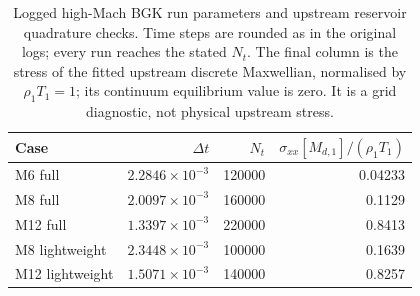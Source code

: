 \documentclass[lineno,paper]{JFM-FLM_Au}
\newcommand{\revisionbox}[1]{\colorbox{revisionyellow}{#1}}
\newcommand{\revisionbox}[1]{#1}
\begin{document}
\begin{table}
\centering
\revisionbox{\begin{minipage}{0.94\textwidth}
\caption{Logged high-Mach BGK run parameters and upstream reservoir quadrature checks. Time steps are rounded as in the original logs; every run reaches the stated $N_t$. The final column is the stress of the fitted upstream discrete Maxwellian, normalised by $\rho_1T_1=1$; its continuum equilibrium value is zero. It is a grid diagnostic, not physical upstream stress.}
\label{tab:high_mach_run_audit}
\centering\small
\begin{tabular}{lrrr}
\toprule
Case & $\Delta t$ & $N_t$ & $\sigma_{xx}[M_{d,1}]/(\rho_1T_1)$\\
\midrule
M6 full & $2.2846\times10^{-3}$ & 120000 & 0.04233\\
M8 full & $2.0097\times10^{-3}$ & 160000 & 0.1129\\
M12 full & $1.3397\times10^{-3}$ & 220000 & 0.8413\\
M8 lightweight & $2.3448\times10^{-3}$ & 100000 & 0.1639\\
M12 lightweight & $1.5071\times10^{-3}$ & 140000 & 0.8257\\
\bottomrule
\end{tabular}
\end{minipage}}\par
\end{table}
\end{document}
